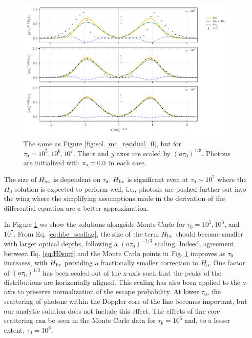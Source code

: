 \documentclass[linenumbers]{aastex63}
\begin{document}
 \begin{figure}
    \centering
    \includegraphics[width=\textwidth]{tau_threepanel.pdf}
    \caption{The same as Figure \ref{fig:sol_mc_residual_0}, but for $\tau_0 = 10^5, 10^6, 10^7$. The $x$ and $y$ axes are scaled by $(a\tau_0)^{1/3}$. Photons are initialized with $\rm x_s = 0.0$ in each case.}
    \label{fig:sol_mc_tau}
\end{figure}

The size of $H_{\rm bc}$ is dependent on $\tau_0$. $H_{\rm bc}$ is significant even at $\tau_0 {\sim} 10^7$ where the $H_0$ solution is expected to perform well, i.e., photons are pushed further out into the wing where the simplifying assumptions made in the derivation of the differential equation are a better approximation. 

In Figure \ref{fig:sol_mc_tau} we show the solutions alongside Monte Carlo for $\tau_0=10^5, 10^6$, and $10^7$. From Eq. \ref{eq:hbc_scaling}, the size of the term $H_{\rm bc}$ should become smaller with larger optical depths, following a $(a\tau_0)^{-1/3}$ scaling. Indeed, agreement between Eq. \ref{eq:H0surf} and the Monte Carlo points in Fig. \ref{fig:sol_mc_tau} improves as $\tau_0$ increases, with $H_{\rm bc}$ providing a fractionally smaller correction to $H_0$. One factor of $(a\tau_0)^{1/3}$ has been scaled out of the x-axis such that the peaks of the distributions are horizontally aligned. This scaling has also been applied to the y-axis to preserve normalization of the escape probability. At lower $\tau_0$, the scattering of photons within the Doppler core of the line becomes important, but our analytic solution does not include this effect. The effects of line core scattering can be seen in the Monte Carlo data for $\tau_0=10^5$ and, to a lesser extent, $
\tau_0=10^6$.
 
\end{document}
